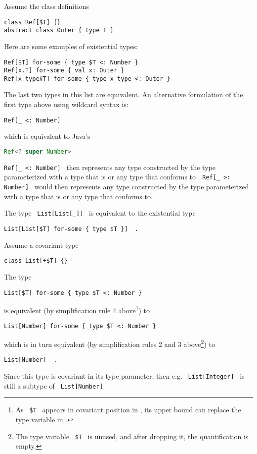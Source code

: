 \example Assume the class definitions
\begin{lstlisting}[mathescape=false]
class Ref[$T] {}
abstract class Outer { type T }
\end{lstlisting}
Here are some examples of existential types:
\begin{lstlisting}[mathescape=false]
Ref[$T] for-some { type $T <: Number }
Ref[x.T] for-some { val x: Outer }
Ref[x_type#T] for-some { type x_type <: Outer }
\end{lstlisting}
The last two types in this list are equivalent. An alternative formulation of the first type above using wildcard syntax is:
\begin{lstlisting}
Ref[_ <: Number]
\end{lstlisting}
which is equivalent to Java's
\begin{lstlisting}[language=Java]
Ref<? super Number>
\end{lstlisting}
\lstinline!Ref[_ <: Number]!~ then represents any type constructed by the type parameterized with a type that is  or any type that conforms to . 
\lstinline!Ref[_ >: Number]!~ would then represents any type constructed by the type  parameterized with a type that is  or any type that  conforms to. 

\example The type ~\lstinline!List[List[_]]!~ is equivalent to the existential type
\begin{lstlisting}[mathescape=false]
List[List[$T] for-some { type $T }]  .
\end{lstlisting}

\example Assume a covariant type
\begin{lstlisting}[mathescape=false]
class List[+$T] {}
\end{lstlisting}
The type 
\begin{lstlisting}[mathescape=false]
List[$T] for-some { type $T <: Number }
\end{lstlisting}
is equivalent (by simplification rule 4 above\footnote{As ~\lstinline[mathescape=false]!$T!~ appears in covariant position in , its upper bound can replace the type variable in .}) to
\begin{lstlisting}[mathescape=false]
List[Number] for-some { type $T <: Number }
\end{lstlisting}
which is in turn equivalent (by simplification rules 2 and 3 above\footnote{The type variable ~\lstinline[mathescape=false]!$T!~ is unused, and after dropping it, the quantification is empty.}) to
\begin{lstlisting}[mathescape=false]
List[Number]  .
\end{lstlisting}
Since this  type is covariant in its type parameter, then e.g. ~\lstinline!List[Integer]!~ is still a subtype of ~\lstinline!List[Number]!. 





